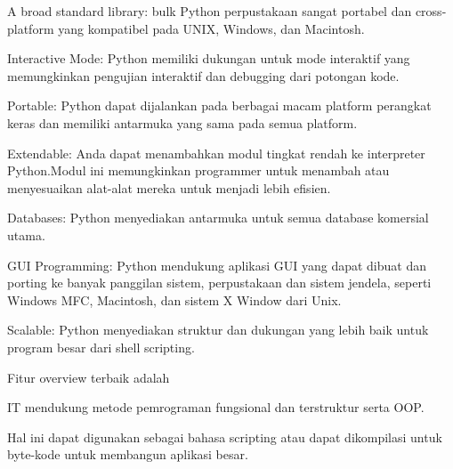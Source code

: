  \par
\noindent 
{\fontsize{14pt}{14pt}\selectfont A broad standard library: bulk Python perpustakaan sangat portabel dan cross-platform yang kompatibel pada UNIX, Windows, dan Macintosh. \\} \par
\noindent 
{\fontsize{14pt}{14pt}\selectfont Interactive Mode: Python memiliki dukungan untuk mode interaktif yang memungkinkan pengujian interaktif dan debugging dari potongan kode. \\} \par
\noindent 
{\fontsize{14pt}{14pt}\selectfont Portable: Python dapat dijalankan pada berbagai macam platform perangkat keras dan memiliki antarmuka yang sama pada semua platform. \\} \par
\noindent 
{\fontsize{14pt}{14pt}\selectfont Extendable: Anda dapat menambahkan modul tingkat rendah ke interpreter Python.Modul ini memungkinkan programmer untuk menambah atau menyesuaikan alat-alat mereka untuk menjadi lebih efisien. \\} \par
\noindent 
{\fontsize{14pt}{14pt}\selectfont Databases: Python menyediakan antarmuka untuk semua database komersial utama. \\} \par
\noindent 
{\fontsize{14pt}{14pt}\selectfont GUI Programming: Python mendukung aplikasi GUI yang dapat dibuat dan porting ke banyak panggilan sistem, perpustakaan dan sistem jendela, seperti Windows MFC, Macintosh, dan sistem X Window dari Unix. \\} \par
\noindent 
{\fontsize{14pt}{14pt}\selectfont Scalable: Python menyediakan struktur dan dukungan yang lebih baik untuk program besar dari shell scripting. \\} \par
\vspace{14pt}
\vspace{14pt}
\noindent 
{\fontsize{14pt}{14pt}\selectfont Fitur overview terbaik adalah  \\} \par
\noindent 
{\fontsize{14pt}{14pt}\selectfont IT mendukung metode pemrograman fungsional dan terstruktur serta OOP. \\} \par
\noindent 
{\fontsize{14pt}{14pt}\selectfont Hal ini dapat digunakan sebagai bahasa scripting atau dapat dikompilasi untuk byte-kode untuk membangun aplikasi besar. \\} \par
